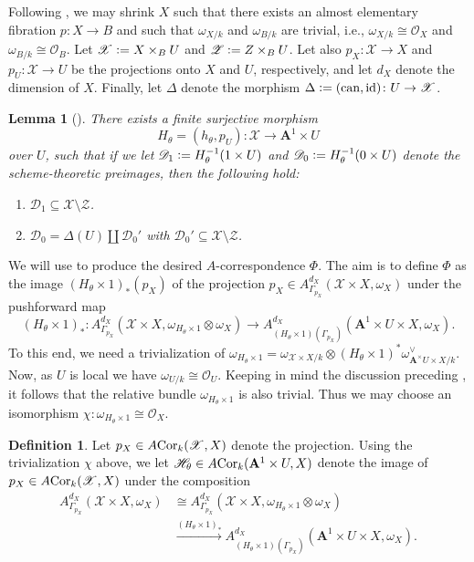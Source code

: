 \documentclass[a4paper, oneside, english,reqno]{amsart}
\theoremstyle{plain}
\newtheorem{lemma}[theorem]{Lemma}
\theoremstyle{definition}
\newtheorem{definition}[theorem]{Definition}
\theoremstyle{remark}
\newcommand{\defeq}{\vcentcolon=}
\newcommand{\ACor}{A\mkern-3mu\Cor}
\newcommand{\A}{\mathbf{A}}
\newcommand{\scrD}{\mathscr{D}}
\newcommand{\scrH}{\mathscr{H}}
\newcommand{\scrX}{\mathscr{X}}
\newcommand{\scrZ}{\mathscr{Z}}
\newcommand{\calO}{\mathcal{O}}
\newcommand{\can}{\mathrm{can}}
\DeclareMathOperator{\id}{id}
\DeclareMathOperator{\Cor}{Cor}
\begin{document}
Following \cite[§7]{hty-inv}, we may shrink $X$ such that there exists an almost elementary fibration $p\colon X\to B$ and such that $\omega_{X/k}$ and $\omega_{B/k}$ are trivial, i.e., $\omega_{X/k}\cong\calO_X$ and $\omega_{B/k}\cong\calO_B$.
Let $\scrX\defeq X\times_BU$ and $\scrZ\defeq Z\times_BU$. Let also $p_X\colon\scrX\to X$ and $p_U\colon\scrX\to U$ be the projections onto $X$ and $U$, respectively, and let $d_X$ denote the dimension of $X$. Finally, let $\Delta$ denote the morphism $\Delta\defeq(\can,\id)\colon U\to \scrX$.

\begin{lemma}[]\label{lemma:nice-map}
There exists a finite surjective morphism 
\[
H_\theta=(h_\theta,p_U)\colon \scrX\to \A^1\times U
\]
over $U$, such that if we let $\scrD_1\defeq H_\theta^{-1}(1\times U)$ and $\scrD_0\defeq H_\theta^{-1}(0\times U)$ denote the scheme-theoretic preimages, then the following hold:
\begin{enumerate}
\item[$(1)$] $\scrD_1\subseteq \scrX\setminus\scrZ$.
\item[$(2)$] $\scrD_0=\Delta(U)\amalg\scrD_0'$ with $\scrD_0'\subseteq\scrX\setminus\scrZ$.
\end{enumerate}
\end{lemma} 

We will use  to produce the desired $A$-correspondence $\Phi$. The aim is to define $\Phi$ as the image $(H_\theta\times1)_*(p_X)$ of the projection $p_X\in A^{d_X}_{\Gamma_{p_X}}(\scrX\times X,\omega_X)$ under the pushforward map
\[
(H_\theta\times1)_*\colon A^{d_X}_{\Gamma_{p_X}}(\scrX\times X,\omega_{H_\theta\times1}\otimes\omega_X)\to A^{d_X}_{(H_\theta\times1)(\Gamma_{p_X})}(\A^1\times U\times X,\omega_X).
\]
To this end, we need a trivialization of $\omega_{H_\theta\times1}=\omega_{\scrX\times X/k}\otimes(H_\theta\times1)^*\omega_{\A^\times U\times X/k}^\vee$. Now, as $U$ is local we have $\omega_{U/k}\cong\calO_U$. Keeping in mind the discussion preceding , it follows that the relative bundle $\omega_{H_\theta\times1}$ is also trivial.   
Thus we may choose an isomorphism $\chi\colon\omega_{H_\theta\times1}\cong\calO_X$.

\begin{definition}
Let $p_X\in\ACor_k(\scrX,X)$ denote the projection. Using the trivialization $\chi$ above, we let $\scrH_\theta\in\ACor_k(\A^1\times U,X)$ denote the image of $p_X\in\ACor_k(\scrX,X)$ under the composition
\begin{align*}
 A^{d_X}_{\Gamma_{p_X}}(\scrX\times X,\omega_X)&\cong A^{d_X}_{\Gamma_{p_X}}(\scrX\times X,\omega_{H_\theta\times1}\otimes\omega_X)\\
&\xrightarrow{(H_\theta\times1)_*} A_{(H_\theta\times1)(\Gamma_{p_X})}^{d_X}(\A^1\times U\times X,\omega_X).
\end{align*}
\end{definition}
\end{document}
